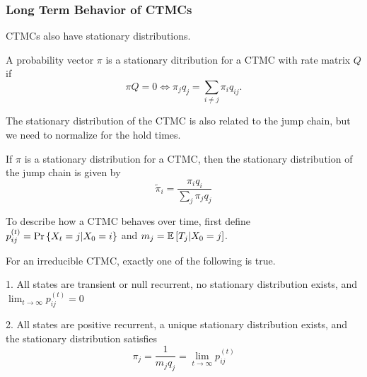 \subsubsection{Long Term Behavior of CTMCs}
CTMCs also have stationary distributions.
\begin{definition}
	A probability vector $\pi$ is a stationary ditribution for a CTMC with rate matrix $Q$ if \[
		\pi Q = 0 \Leftrightarrow \pi_jq_j = \sum_{i\neq j}\pi_iq_{ij}.
	\]
	\label{defn:ctmc-stationary}
\end{definition}
The stationary distribution of the CTMC is also related to the jump chain, but we need to normalize for the hold times.
\begin{theorem}
	If $\pi$ is a stationary distribution for a CTMC, then the stationary distribution of the jump chain is given by \[
		\tilde{\pi}_i = \frac{\pi_i q_i}{\sum_j \pi_j q_j} 
	\]
	\label{thm:ctmc-jump-stationary}
\end{theorem}
To describe how a CTMC behaves over time, first define $p_{ij}^{(t)} = \text{Pr}\left\{X_t=j|X_0=i\right\}$ and $m_j = \mathbb{E}\left[T_j|X_0=j\right]$.
\begin{theorem}
	For an irreducible CTMC, exactly one of the following is true.

	1. All states are transient or null recurrent, no stationary distribution exists, and $\lim_{t\to\infty}p_{ij}^{(t)} = 0$
	
	2. All states are positive recurrent, a unique stationary distribution exists, and the stationary distribution satisfies \[
		\pi_j = \frac{1}{m_jq_j} = \lim_{t\to\infty}p_{ij}^{(t)}
	\]
	\label{thm:ctmc-big}
\end{theorem}
